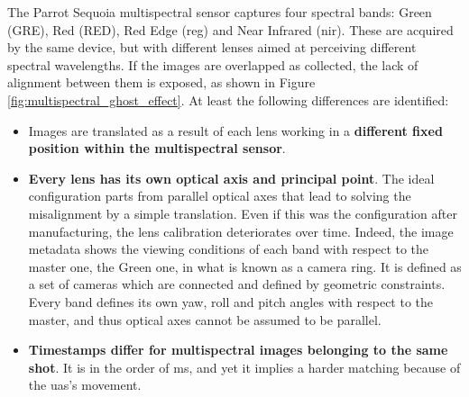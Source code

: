 The Parrot Sequoia multispectral sensor captures four spectral bands: Green (GRE), Red (RED), Red Edge (\acrshort{reg}) and Near Infrared (\acrshort{nir}). These are acquired by the same device, but with different lenses aimed at perceiving different spectral wavelengths. If the images are overlapped as collected, the lack of alignment between them is exposed, as shown in Figure \ref{fig:multispectral_ghost_effect}. At least the following differences are identified: 
\begin{itemize}
    \item Images are translated as a result of each lens working in a \textbf{different fixed position within the multispectral sensor}. 
    \item \textbf{Every lens has its own optical axis and principal point}. The ideal configuration parts from parallel optical axes that lead to solving the misalignment by a simple translation. Even if this was the configuration after manufacturing, the lens calibration deteriorates over time. Indeed, the image metadata shows the viewing conditions of each band with respect to the master one, the Green one, in what is known as a camera ring. It is defined as a set of cameras which are connected and defined by geometric constraints. Every band defines its own yaw, roll and pitch angles with respect to the master, and thus optical axes cannot be assumed to be parallel.
    \item \textbf{Timestamps differ for multispectral images belonging to the same shot}. It is in the order of \si{\milli\second}, and yet it implies a harder matching because of the \acrshort{uas}'s movement.
\end{itemize}

